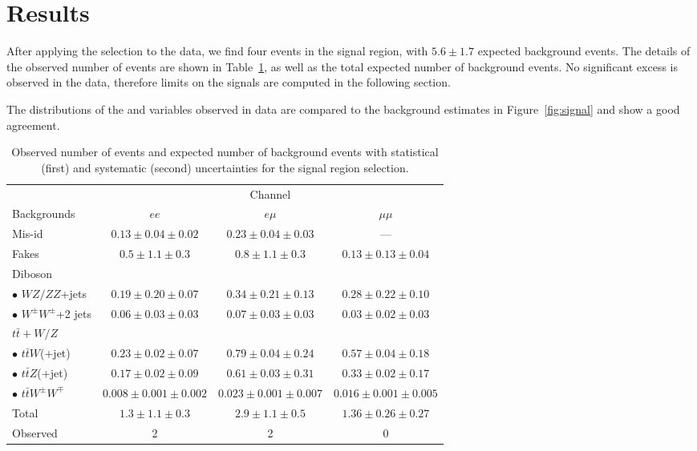 \section{Results}\label{sect:results}
After applying the selection to the data, we find four events in the signal region, with $5.6\pm1.7$ 
expected background events. The details of the observed number of events are shown in 
Table~\ref{finalyield}, as well as the total expected number of background events. 
No significant excess is observed in the data, 
therefore limits on the signals are computed in the following section.

The distributions of the \met{} and \HT{} variables observed in data are compared to the background
estimates in Figure~\ref{fig:signal} and show a good agreement.

\begin{table}[t]
  \begin{center}
    \caption{Observed number of events and expected number of background events with 
        statistical (first) and systematic (second) uncertainties for the signal region
        selection.}\label{finalyield}
    \begin{tabular}{l|c|c|c}
      \hline\hline
       & \multicolumn{3}{c}{Channel} \\
      \cline{2-4}
      Backgrounds & $ee$ & $e\mu$ & $\mu\mu$ \\
      \hline
      Mis-id & $0.13\pm 0.04 \pm 0.02$ & $0.23\pm 0.04 \pm 0.03$ & --- \\
      Fakes & $0.5\pm 1.1 \pm 0.3$ & $0.8\pm 1.1 \pm 0.3$ & $0.13\pm 0.13\pm 0.04$ \\
      \hline
      Diboson & & & \\
      $\bullet$ $WZ/ZZ$+jets & $0.19\pm 0.20 \pm 0.07$ & $0.34\pm 0.21\pm 0.13$ & $0.28\pm 0.22\pm 0.10$ \\
      $\bullet$ $W^{\pm}W^\pm$+2 jets & $0.06\pm 0.03\pm 0.03$ & $0.07\pm 0.03\pm 0.03$ & $0.03\pm 0.02\pm 0.03$ \\
      \hline
      $t\bar{t}+W/Z$ & & & \\
      $\bullet$ $t\bar{t}W$(+jet) & $0.23\pm 0.02\pm 0.07$ & $0.79\pm 0.04\pm 0.24$ & $0.57\pm 0.04\pm 0.18$ \\
      $\bullet$ $t\bar{t}Z$(+jet) & $0.17\pm 0.02\pm 0.09$ & $0.61\pm 0.03\pm 0.31$ & $0.33\pm 0.02\pm 0.17$ \\
      $\bullet$ $t\bar{t}W^{\pm}W^\mp$ & $0.008\pm 0.001\pm 0.002$ & $0.023\pm 0.001\pm 0.007$ & $0.016\pm 0.001\pm 0.005$ \\
      \hline
      Total & $1.3 \pm 1.1 \pm 0.3$ & $2.9 \pm 1.1 \pm 0.5$ & $1.36 \pm 0.26 \pm 0.27$ \\
      \hline
      Observed & 2 & 2 & 0 \\
      \hline
    \end{tabular}
  \end{center}
\end{table}

